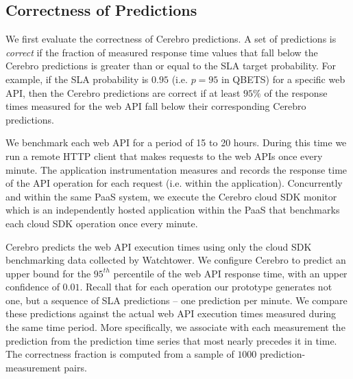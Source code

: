 \subsection{Correctness of Predictions}
\label{sec:correctness}

We first evaluate the correctness of Cerebro predictions.  A set of
predictions is \textit{correct} if the fraction of measured response time values that
fall below the Cerebro predictions is greater than or equal to
the SLA target probability. 
For example, if the SLA probability is $0.95$ (i.e. $p=95$ in QBETS) for
a specific web API, then the Cerebro predictions are correct if at least
$95\%$ of the response times measured for the web API fall below their
corresponding Cerebro predictions. 

We benchmark each web API for a period of 15 to 20 hours.  During this time we
run a remote HTTP client that makes requests to the web APIs once every
minute.  The application instrumentation measures and records the response
time of the API operation for each request (i.e. within the application).
Concurrently and within the same PaaS system, we execute the Cerebro
cloud SDK monitor which is an independently hosted application within the
PaaS that benchmarks each cloud SDK operation once every minute.

Cerebro predicts the web API execution times using only the cloud SDK
benchmarking data collected by Watchtower. We configure Cerebro to predict an
upper bound for the $95^{th}$ percentile of the web API response time, with an
upper confidence of $0.01$. Recall that for each operation our prototype
generates not one, but a sequence of SLA predictions -- one prediction per
minute.  We compare these predictions against the actual web API execution
times measured during the same time period. More specifically, we
associate with each measurement the prediction from the prediction time series
that most nearly precedes it in time.  The correctness fraction is computed
from a sample of $1000$ prediction-measurement pairs.


